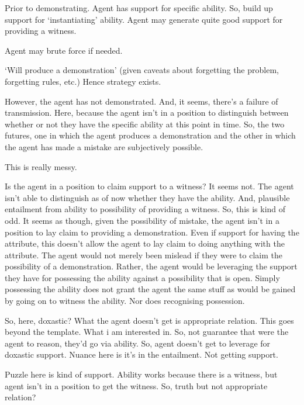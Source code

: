 \documentclass[10pt]{article}
\begin{document}
\begin{note}
  Prior to demonstrating.
  Agent has support for specific ability.
  So, build up support for `instantiating' ability.
  Agent may generate quite good support for providing a witness.

  Agent may brute force if needed.

  `Will produce a demonstration' (given caveats about forgetting the problem, forgetting rules, etc.)
  Hence strategy exists.

  However, the agent has not demonstrated.
  And, it seems, there's a failure of transmission.
  Here, because the agent isn't in a position to distinguish between whether or not they have the specific ability at this point in time.
  So, the two futures, one in which the agent produces a demonstration and the other in which the agent has made a mistake are subjectively possible.


  {
    \color{red}
    This is really messy.
  }


  {
    \color{blue}
    Is the agent in a position to claim support to a witness?
    It seems not.
    The agent isn't able to distinguish as of now whether they have the ability.
    And, plausible entailment from ability to possibility of providing a witness.
    So, this is kind of odd.
    It seems as though, given the possibility of mistake, the agent isn't in a position to lay claim to providing a demonstration.
    Even if support for having the attribute, this doesn't allow the agent to lay claim to doing anything with the attribute.
    The agent would not merely been mislead if they were to claim the possibility of a demonstration.
    Rather, the agent would be leveraging the support they have for possessing the ability against a possibility that is open.
    Simply possessing the ability does not grant the agent the same stuff as would be gained by going on to witness the ability.
    Nor does recognising possession.

    So, here, doxastic?
    What the agent doesn't get is appropriate relation.
    This goes beyond the template.
    What i am interested in.
    So, not guarantee that were the agent to reason, they'd go via ability.
    So, agent doesn't get to leverage for doxastic support.
    Nuance here is it's in the entailment.
    Not getting support.

    Puzzle here is kind of support.
    Ability works because there is a witness, but agent isn't in a position to get the witness.
    So, truth but not appropriate relation?

}
\end{note}
\end{document}
